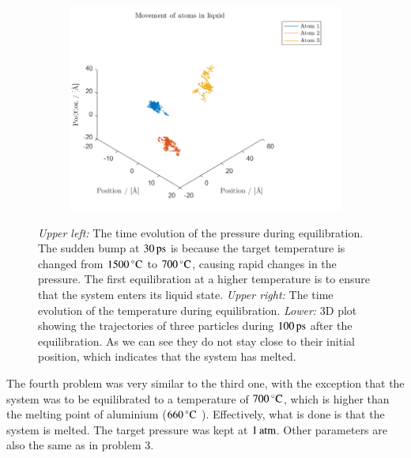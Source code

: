 \begin{figure}[H]
\begin{subfigure}[b]{0.40\textwidth}
    \end{subfigure}
    \begin{subfigure}[b]{0.40\textwidth}
        \centering
        \includegraphics[width=\textwidth]{graphics/task4/traj.png}
    \end{subfigure}
    \caption{\textit{Upper left:} The time evolution of the pressure during equilibration. The sudden bump at $\unit[30]{ps}$ is because the target temperature is changed from $\unit[1500]{^\circ C}$ to $\unit[700]{^\circ C}$, causing rapid changes in the pressure. The first equilibration at a higher temperature is to ensure that the system enters its liquid state. \textit{Upper right:} The time evolution of the temperature during equilibration. \textit{Lower:} 3D plot showing the trajectories of three particles during $\unit[100]{ps}$ after the equilibration. As we can see they do not stay close to their initial position, which indicates that the system has melted.}
    \label{fig:equilibrium700}
\end{figure}

The fourth problem was very similar to the third one, with the exception that the system was to be equilibrated to a temperature of $\unit[700]{^\circ C}$, which is higher than the melting point of aluminium ($\unit[660]{^\circ C}$ \cite{al_wiki}). Effectively, what is done is that the system is melted. The target pressure was kept at $\unit[1]{atm}$. Other parameters are also the same as in problem 3.

